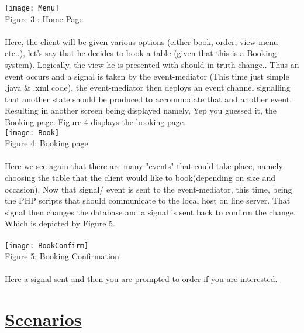 \documentclass{article}
\begin{document}
\texttt{[image: Menu]}\\  
Figure 3 : Home Page\\\\ Here, the client will be given various options (either book, order, view menu etc..), let's say that he decides to book a table (given that this is a Booking system). Logically, the view he is presented with should in truth change.. Thus an event occurs and a signal is taken by the event-mediator (This time just simple .java & .xml code), the event-mediator then deploys an event channel signalling that another state should be produced to accommodate that and another event. Resulting in another screen being displayed namely, Yep you guessed it, the Booking page. Figure 4 displays the booking page.\\
\texttt{[image: Book]}\\ 
Figure 4: Booking page\\\\ Here we see again that there are many "events" that could take place, namely choosing the table that the client would like to book(depending on size and occasion). Now that signal/ event is sent to the event-mediator, this time, being the PHP scripts that should communicate to the local host on line server. That signal then changes the database and a signal is sent back to confirm the change. Which is depicted by Figure 5.\\\\
\texttt{[image: BookConfirm]} \\
Figure 5: Booking Confirmation\\\\ Here a signal sent and then you are prompted to order if you are interested.
\pagebreak
\section{\underline{Scenarios}}
\end{document}
